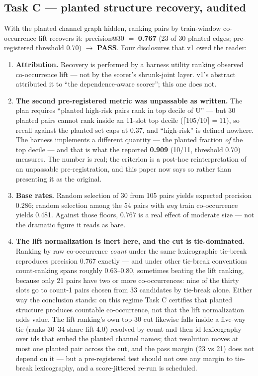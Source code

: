 \documentclass[11pt]{article}
\begin{document}
\subsection{Task C --- planted structure recovery, audited}
\label{sec:taskc}

With the planted channel graph hidden, ranking pairs by train-window
co-occurrence lift recovers it: precision@30 $=$ \textbf{0.767} (23 of 30
planted edges; pre-registered threshold 0.70) $\to$ \textbf{PASS}. Four
disclosures that v1 owed the reader:

\begin{enumerate}[leftmargin=1.6em]
\item \textbf{Attribution.} Recovery is performed by a harness utility
  ranking observed co-occurrence lift --- not by the scorer's shrunk-joint
  layer. v1's abstract attributed it to ``the dependence-aware scorer'';
  this one does not.
\item \textbf{The second pre-registered metric was unpassable as written.}
  The plan requires ``planted high-risk pairs rank in top decile of U'' ---
  but 30 planted pairs cannot rank inside an 11-slot top decile
  ($\lceil 105/10 \rceil = 11$), so recall against the planted set caps at
  0.37, and ``high-risk'' is defined nowhere. The harness implements a
  different quantity --- the planted fraction \emph{of} the top decile ---
  and that is what the reported \textbf{0.909} (10/11, threshold 0.70)
  measures. The number is real; the criterion is a post-hoc
  reinterpretation of an unpassable pre-registration, and this paper now
  says so rather than presenting it as the original.
\item \textbf{Base rates.} Random selection of 30 from 105 pairs yields
  expected precision 0.286; random selection among the 54 pairs with
  \emph{any} train co-occurrence yields 0.481. Against those floors, 0.767
  is a real effect of moderate size --- not the dramatic figure it reads as
  bare.
\item \textbf{The lift normalization is inert here, and the cut is
  tie-dominated.} Ranking by raw co-occurrence \emph{count} under the same
  lexicographic tie-break reproduces precision 0.767 exactly --- and under
  other tie-break conventions count-ranking spans roughly 0.63--0.80,
  sometimes beating the lift ranking, because only 21 pairs have two or
  more co-occurrences: nine of the thirty slots go to count-1 pairs chosen
  from 33 candidates by tie-break alone. Either way the conclusion stands:
  on this regime Task C certifies that planted structure produces countable
  co-occurrence, not that the lift normalization adds value. The lift
  ranking's own top-30 cut likewise falls inside a five-way tie (ranks
  30--34 share lift 4.0) resolved by count and then id lexicography over
  ids that embed the planted channel names; that resolution moves at most
  one planted pair across the cut, and the pass margin (23 vs 21) does not
  depend on it --- but a pre-registered test should not owe any margin to
  tie-break lexicography, and a score-jittered re-run is scheduled.
\end{enumerate}
\end{document}
